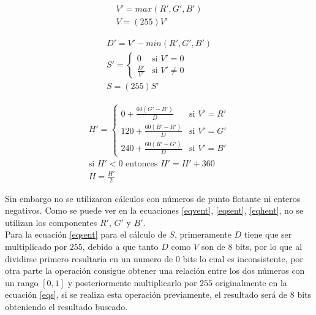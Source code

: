 \documentclass[twoside,spanish,ESP,MSc]{plantillaLabUPV}
\theoremstyle{definition}
\begin{document}
\begin{equation} \label{eqv}
\begin{gathered}
V'= max(R',G',B')\\
V = (255)V'
\end{gathered}
\end{equation}

\begin{equation} \label{eqs}
\begin{gathered}
D' = V' - min(R',G',B') \\
S' = \left \{ \begin{matrix} 
				0 & \mbox{si } V' = 0 \\
				\frac{D'}{V'} & \mbox{si }V' \neq 0
			  \end{matrix}\right. \\
S = (255)S'
\end{gathered}
\end{equation}

\begin{equation}\label{eqh}
\begin{gathered}
{ H' = \left \{ \begin{matrix} 0 + \frac{60(G'-B')}{D} & \mbox{si }V'=R'
	\\ 120 + \frac{60(B'-R')}{D} & \mbox{si } V'=G'
	\\ 240 + \frac{60(R'-G')} {D} & \mbox{si }V'=B'\end{matrix}\right. } \\
\mbox{si } H' < 0 \mbox{ entonces } H' = H' + 360 \\
H = \frac{H'}{2}
\end{gathered}
\end{equation}

Sin embargo no se utilizaron cálculos con números de punto flotante ni enteros negativos. Como se puede ver en la ecuaciones \ref{eqvent}, \ref{eqsent}, \ref{eqhent}, no se utilizan los componentes $R'$, $G'$ y $B'$. \\

Para la ecuación \ref{eqsent} para el cálculo de $S$, primeramente $D$ tiene que ser multiplicado por $255$, debido a que tanto $D$ como $V$ son de 8 bits, por lo que al dividirse primero resultaría en un numero de $0$ bits lo cual es inconsistente, por otra parte la operación consigue obtener una relación entre los dos números con un rango $[0,1]$ y posteriormente multiplicarlo por $255$ originalmente en la ecuación \ref{eqs}, si se realiza esta operación previamente, el resultado será de 8 bits obteniendo el resultado buscado. \\
\end{document}

